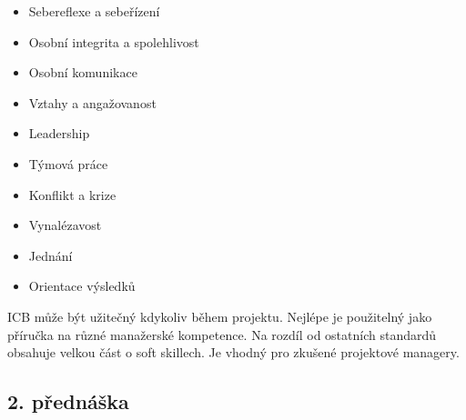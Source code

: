 \documentclass[11pt,a4paper]{article}
\begin{document}
        \begin{multicols}{2}
        \begin{itemize}
            \item Sebereflexe a sebeřízení
            \item Osobní integrita a spolehlivost
            \item Osobní komunikace
            \item Vztahy a angažovanost
            \item Leadership
            \item Týmová práce
            \item Konflikt a krize
            \item Vynalézavost
            \item Jednání
            \item Orientace výsledků
        \end{itemize}
        \end{multicols}
        ICB může být užitečný kdykoliv během projektu. Nejlépe je použitelný jako příručka na různé manažerské kompetence. Na rozdíl od ostatních standardů obsahuje velkou část o soft skillech. Je vhodný pro zkušené projektové managery.

    \subsection{2. přednáška \cite{pres-2}}
\end{document}
